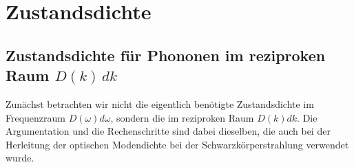 
\renewcommand{\lastmod}{6. Mai 2025}
\renewcommand{\chapterauthors}{Markus Lippitz}


\chapter{Zustandsdichte}


\section{Zustandsdichte für Phononen im reziproken Raum $D(k) \, dk$ }

Zunächst betrachten wir nicht die eigentlich benötigte Zustandsdichte im Frequenzraum $D(\omega) d\omega$, sondern die im reziproken Raum $D(k) dk$. Die Argumentation und die Rechenschritte sind dabei dieselben, die auch bei der Herleitung der optischen Modendichte bei der Schwarzkörperstrahlung verwendet wurde.

